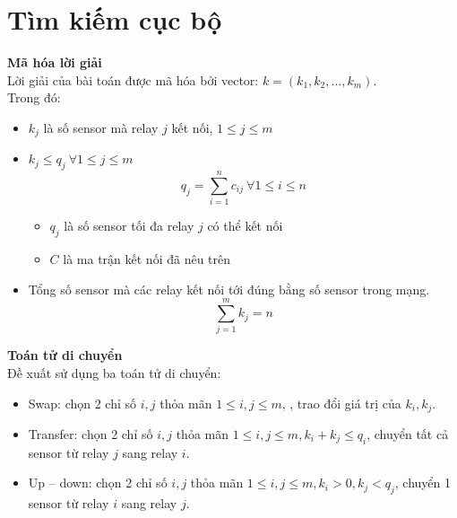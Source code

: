  \section{Tìm kiếm cục bộ}
 \textbf{Mã hóa lời giải}
 \\Lời giải của bài toán được mã hóa bởi vector: $k = (k_1, k_2,…, k_m)$.
\\Trong đó: 
\begin{itemize}
    \item $k_j$ là số sensor mà relay $j$ kết nối, $1 \leq j \leq m$
    \item $k_j \leq q_j ~\forall 1 \leq j \leq m$ 
    \begin{equation*}
        q_j = \sum_{i = 1}^n c_{ij} ~\forall 1 \leq i \leq n
    \end{equation*}
    \begin{itemize}
        \item[] $q_j$ là số sensor tối đa relay $j$ có thể kết nối
        \item[] $C$ là ma trận kết nối đã nêu trên
    \end{itemize}
    \item Tổng số sensor mà các relay kết nối tới đúng bằng số sensor trong mạng.
    \begin{equation*}
        \sum_{j = 1}^m k_j = n
    \end{equation*}
\end{itemize}
\textbf{Toán tử di chuyển}
\\Đề xuất sử dụng ba toán tử di chuyển:
\begin{itemize}
    \item Swap: chọn 2 chỉ số $i, j$ thỏa mãn $1 \leq i, j \leq m$, , trao đổi giá trị của $k_i, k_j$. 
    \item Transfer: chọn 2 chỉ số $i, j$ thỏa mãn $1 \leq i, j \leq m, k_i + k_j \leq q_i$, chuyển tất cả sensor từ relay $j$ sang relay $i$.
    \item Up – down: chọn 2 chỉ số $i, j$ thỏa mãn $1 \leq i, j \leq m, k_i > 0, k_j < q_j$, chuyển 1 sensor từ relay $i$ sang relay $j$.
\end{itemize}

